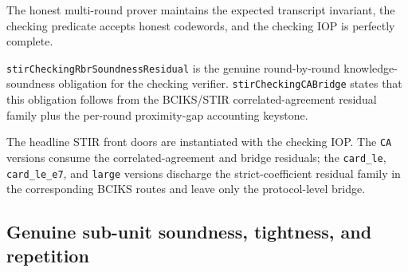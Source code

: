 \begin{theorem}\label{thm:stir_checking_completeness}
    The honest multi-round prover maintains the expected transcript invariant, the checking
    predicate accepts honest codewords, and the checking IOP is perfectly complete.
\end{theorem}

\begin{definition}\label{def:stir_checking_residuals}
    \texttt{stirCheckingRbrSoundnessResidual} is the genuine round-by-round knowledge-soundness
    obligation for the checking verifier.  \texttt{stirCheckingCABridge} states that this
    obligation follows from the BCIKS/STIR correlated-agreement residual family plus the
    per-round proximity-gap accounting keystone.
\end{definition}

\begin{theorem}\label{thm:stir_checking_front_doors}
    The headline STIR front doors are instantiated with the checking IOP.  The \texttt{CA}
    versions consume the correlated-agreement and bridge residuals; the \texttt{card\_le},
    \texttt{card\_le\_e7}, and \texttt{large} versions discharge the strict-coefficient
    residual family in the corresponding BCIKS routes and leave only the protocol-level bridge.
\end{theorem}


\subsection{Genuine sub-unit soundness, tightness, and repetition}\label{sec:stir_subunit}

